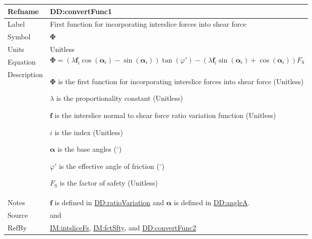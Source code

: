 \documentclass[12pt]{article}
\begin{document}
\medskip
\noindent
\begin{minipage}{\textwidth}
\begin{tabular}{>{\raggedright}p{}>{\raggedright\arraybackslash}p{}}
\toprule \textbf{Refname} & \textbf{DD:convertFunc1}
\label{DD:convertFunc1}
\\ \midrule
Label & First function for incorporating interslice forces into shear force
        
\\ \midrule
Symbol & $\symbf{Φ}$
         
\\ \midrule
Units & Unitless
        
\\ \midrule
Equation & \begin{displaymath}
           \symbf{Φ}=\left(λ {\symbf{f}}_{i} \cos\left({\symbf{α}}_{i}\right)-\sin\left({\symbf{α}}_{i}\right)\right) \tan\left(φ'\right)-\left(λ {\symbf{f}}_{i} \sin\left({\symbf{α}}_{i}\right)+\cos\left({\symbf{α}}_{i}\right)\right) {F_{\text{S}}}
           \end{displaymath}
\\ \midrule
Description & \begin{symbDescription}
              \item{$\symbf{Φ}$ is the first function for incorporating interslice forces into shear force (Unitless)}
              \item{$λ$ is the proportionality constant (Unitless)}
              \item{$\symbf{f}$ is the interslice normal to shear force ratio variation function (Unitless)}
              \item{$i$ is the index (Unitless)}
              \item{$\symbf{α}$ is the base angles (${{}^{\circ}}$)}
              \item{$φ'$ is the effective angle of friction (${{}^{\circ}}$)}
              \item{${F_{\text{S}}}$ is the factor of safety (Unitless)}
              \end{symbDescription}
\\ \midrule
Notes & $\symbf{f}$ is defined in \hyperref[DD:ratioVariation]{DD:ratioVariation} and $\symbf{α}$ is defined in \hyperref[DD:angleA]{DD:angleA}.
        
\\ \midrule
Source & \cite{chen2005} and \cite{karchewski2012}
         
\\ \midrule
RefBy & \hyperref[IM:intsliceFs]{IM:intsliceFs}, \hyperref[IM:fctSfty]{IM:fctSfty}, and \hyperref[DD:convertFunc2]{DD:convertFunc2}
        
\\ \bottomrule
\end{tabular}
\end{minipage}
\end{document}
